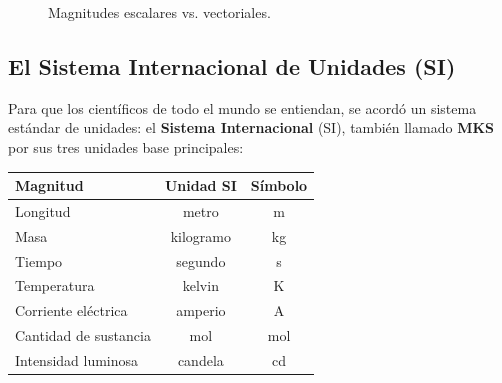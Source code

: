 \documentclass[12pt, letterpaper]{article}
\begin{document}
\begin{figure}[h!]
  \caption{Magnitudes escalares vs. vectoriales.}
  \label{fig:magnitudes}
\end{figure}

\subsection{El Sistema Internacional de Unidades (SI)}

Para que los científicos de todo el mundo se entiendan, se acordó un sistema estándar de unidades: el \textbf{Sistema Internacional} (SI), también llamado \textbf{MKS} por sus tres unidades base principales:

\begin{center}
  \begin{tabular}{lcc}
    \toprule
    \textbf{Magnitud}     & \textbf{Unidad SI} & \textbf{Símbolo} \\
    \midrule
    Longitud              & metro              & m                \\
    Masa                  & kilogramo          & kg               \\
    Tiempo                & segundo            & s                \\
    Temperatura           & kelvin             & K                \\
    Corriente eléctrica   & amperio            & A                \\
    Cantidad de sustancia & mol                & mol              \\
    Intensidad luminosa   & candela            & cd               \\
    \bottomrule
  \end{tabular}
\end{center}
\end{document}
